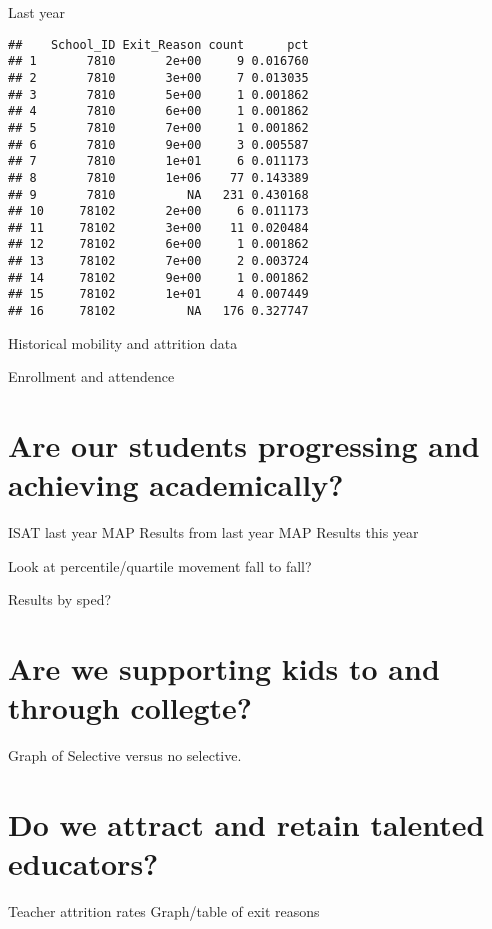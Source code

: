\documentclass[sfsidenotes, justified]{tufte-handout}\usepackage{graphicx, color}
\makeatletter
\newenvironment{kframe}{%
 \def\at@end@of@kframe{}%
 \ifinner\ifhmode%
  \def\at@end@of@kframe{\end{minipage}}%
  \begin{minipage}{\columnwidth}%
 \fi\fi%
 \def\FrameCommand##1{\hskip\@totalleftmargin \hskip-\fboxsep
 \colorbox{shadecolor}{##1}\hskip-\fboxsep
     \hskip-\linewidth \hskip-\@totalleftmargin \hskip\columnwidth}%
 \MakeFramed {\advance\hsize-\width
   \@totalleftmargin\z@ \linewidth\hsize
   \@setminipage}}%
 {\par\unskip\endMakeFramed%
 \at@end@of@kframe}
\newenvironment{knitrout}{}{} %
\makeatother
\begin{document}
Last year 
\begin{knitrout}
\color{fgcolor}\begin{kframe}
\begin{verbatim}
##    School_ID Exit_Reason count      pct
## 1       7810       2e+00     9 0.016760
## 2       7810       3e+00     7 0.013035
## 3       7810       5e+00     1 0.001862
## 4       7810       6e+00     1 0.001862
## 5       7810       7e+00     1 0.001862
## 6       7810       9e+00     3 0.005587
## 7       7810       1e+01     6 0.011173
## 8       7810       1e+06    77 0.143389
## 9       7810          NA   231 0.430168
## 10     78102       2e+00     6 0.011173
## 11     78102       3e+00    11 0.020484
## 12     78102       6e+00     1 0.001862
## 13     78102       7e+00     2 0.003724
## 14     78102       9e+00     1 0.001862
## 15     78102       1e+01     4 0.007449
## 16     78102          NA   176 0.327747
\end{verbatim}
\end{kframe}
\end{knitrout}





Historical mobility and attrition data

Enrollment and attendence

\section{Are our students progressing and achieving academically?}

ISAT last year
MAP Results from last year
MAP Results this year

Look at percentile/quartile movement fall to fall?  

Results by sped?

\section{Are we supporting kids to and through collegte?}

Graph of Selective versus no selective.

\section{Do we attract and retain talented educators?}

Teacher attrition rates
Graph/table of exit reasons
\end{document}
